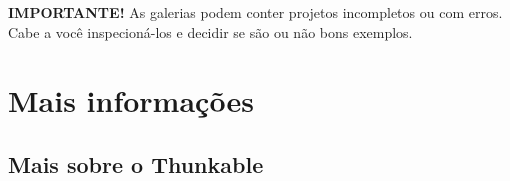 \documentclass[11pt,fleqn]{book} %
\begin{document}
\textbf{IMPORTANTE!} As galerias podem conter projetos incompletos ou com erros. Cabe a você inspecioná-los e decidir se são ou não bons exemplos.







\chapter{Mais informações}


\section{Mais sobre o Thunkable}
\end{document}
